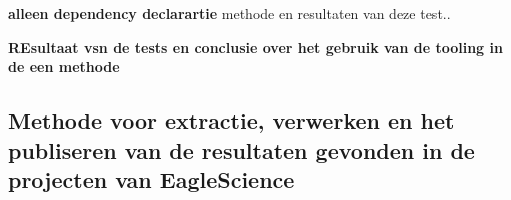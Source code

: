 \textbf{alleen dependency declarartie} methode en resultaten van deze test..


\textbf{REsultaat vsn de tests en conclusie over het gebruik van de tooling in de een methode}



\subsection{Methode voor extractie, verwerken en het publiseren van de resultaten gevonden in de projecten van EagleScience}\label{sec:methodeSOUPES}

%
%
